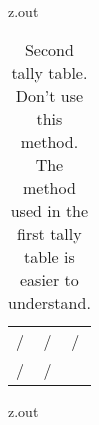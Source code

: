 \begin{VerbatimOut}{z.out}
\begin{table}[h]
  \caption{%
    Second tally table.
    Don't use this method.
    The method used in the first tally table
    is easier to understand.%
  }%
  \vspace*{6pt}
  \begin{tabularx}{\textwidth}{@{\kern\tlen}XXl@{\kern\tlen}}%
    \g 01/& \g 02/& \g 03/\\
    \g 04/& \g 05/\\
  \end{tabularx}%
\end{table}
\end{VerbatimOut}

\MyIO



\MyIO
  

\begin{VerbatimOut}{z.out}


\FloatBarrier
\end{VerbatimOut}

\MyIO





